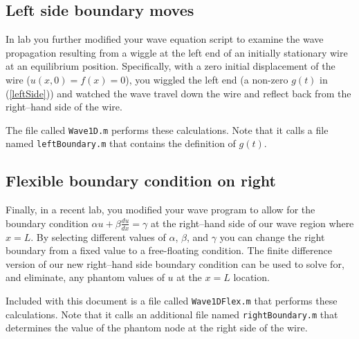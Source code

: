 \documentclass[11pt]{article}
\newcommand{\ds}{\displaystyle}
\begin{document}

\subsection{Left side boundary moves}
In lab you further modified your wave equation script to examine
the wave propagation resulting from a wiggle at the left end of an
initially stationary wire at an equilibrium position. Specifically,
with a zero initial displacement of the wire ($u(x,0) = f(x) = 0$),
you wiggled the left end (a non-zero $g(t)$ in (\ref{leftSide}))
and watched the wave travel down the wire and reflect back from the
right--hand side of the wire.

The file called {\tt Wave1D.m} performs these calculations.
Note that it calls a file named {\tt leftBoundary.m} that contains
the definition of $g(t)$.




\subsection{Flexible boundary condition on right}
Finally, in a recent lab, you modified your wave program to allow
for the boundary condition
$\ds \alpha u + \beta \frac{d u}{d x}= \gamma$
at the right--hand side of our wave region where $x = L$.
By selecting different values of $\alpha$, $\beta$, and $\gamma$
you can change the right boundary from a fixed value to
a free-floating condition. The finite difference version
of our new right--hand side boundary condition can be used to
solve for, and eliminate, any phantom values of $u$ at the
$x=L$ location.

Included with this document is a file called {\tt Wave1DFlex.m} that
performs these calculations. Note that it calls an additional file
named {\tt rightBoundary.m} that determines the value of the phantom
node at the right side of the wire.



\end{document}
